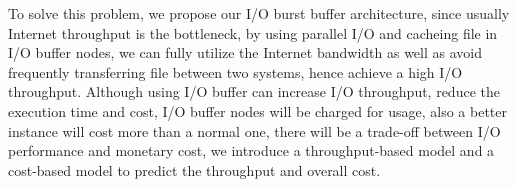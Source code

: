 To solve this problem, we propose our I/O burst buffer architecture, since usually Internet throughput is the bottleneck, by using parallel I/O and cacheing file in I/O buffer nodes, we can fully utilize the Internet bandwidth as well as avoid frequently transferring file between two systems, hence achieve a high I/O throughput.
Although using I/O buffer can increase I/O throughput, reduce the execution time and cost, I/O buffer nodes will be charged for usage, also a better instance will cost more than a normal one, there will be a trade-off between I/O performance and monetary cost, we introduce a throughput-based model and a cost-based model to predict the throughput and overall cost.





